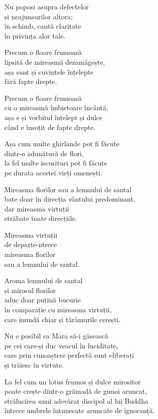 Nu poposi asupra defectelor\\
și neajunsurilor altora;\\
în schimb, caută claritate\\
în privința alor tale.


Precum o floare frumoasă\\
lipsită de mireasmă dezamăgește,\\
așa sunt și cuvintele înțelepte\\
fără fapte drepte.



Precum o floare frumoasă\\
cu o mireasmă îmbietoare încântă,\\
așa e și vorbitul înțelept și dulce\\
când e însoțit de fapte drepte.


Așa cum multe ghirlande pot fi făcute\\
dintr-o adunătură de flori,\\
la fel multe iscusituri pot fi făcute\\
pe durata acestei vieți omenești.


Mireasma florilor sau a lemnului de santal\\
bate doar în direcția vântului predominant,\\
dar mireasma virtuții\\
străbate toate direcțiile.


Mireasma virtuții\\
de departe-ntrece\\
mireasma florilor\\
sau a lemnului de santal.


Aroma lemnului de santal\\
și mirosul florilor\\
aduc doar puțină bucurie\\
în comparație cu mireasma virtuții,\\
care inundă chiar și tărâmurile cerești.


Nu e posibil ca Mara să-i găsească\\
pe cei care-și duc veacul în luciditate,\\
care prin cunoaștere perfectă sunt eliberați\\
și trăiesc în virtute.

La fel cum un lotus frumos și dulce mirositor\\
poate crește dintr-o grămadă de gunoi aruncat,\\
strălucirea unui adevărat discipol al lui Buddha\\
întrece umbrele întunecate aruncate de ignoranță.
